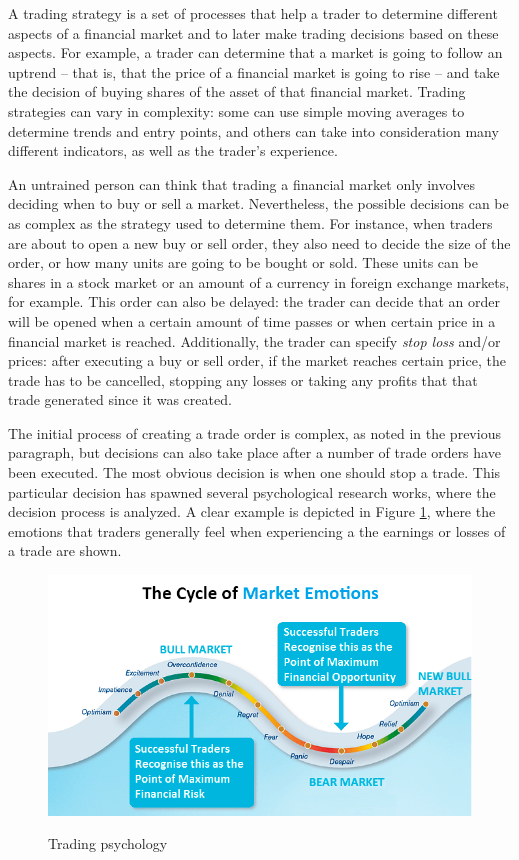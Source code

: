 A trading strategy is a set of processes that help a trader to determine different aspects of a financial market and to later make trading decisions based on these aspects. For example, a trader can determine that a market is going to follow an uptrend -- that is, that the price of a financial market is going to rise -- and take the decision of buying shares of the asset of that financial market. Trading strategies can vary in complexity: some can use simple moving averages to determine trends and entry points, and others can take into consideration many different indicators, as well as the trader's experience.

An untrained person can think that trading a financial market only involves deciding when to buy or sell a market. Nevertheless, the possible decisions can be as complex as the strategy used to determine them. For instance, when traders are about to open a new buy or sell order, they also need to decide the size of the order, or how many units are going to be bought or sold. These units can be shares in a stock market or an amount of a currency in foreign exchange markets, for example. This order can also be delayed: the trader can decide that an order will be opened when a certain amount of time passes or when certain price in a financial market is reached. Additionally, the trader can specify \textit{stop loss} and/or  prices: after executing a buy or sell order, if the market reaches certain price, the trade has to be cancelled, stopping any losses or taking any profits that that trade generated since it was created.

The initial process of creating a trade order is complex, as noted in the previous paragraph, but decisions can also take place after a number of trade orders have been executed. The most obvious decision is when one should stop a trade. This particular decision has spawned several psychological research works, where the decision process is analyzed. A clear example is depicted in Figure \ref{figure:trading-psychology}, where the emotions that traders generally feel when experiencing a the earnings or losses of a trade are shown.

\begin{figure}
\caption{Trading psychology}
\centering
\includegraphics[width=1.0\textwidth]{img/trading-psychology.png}
\label{figure:trading-psychology}
\end{figure}

